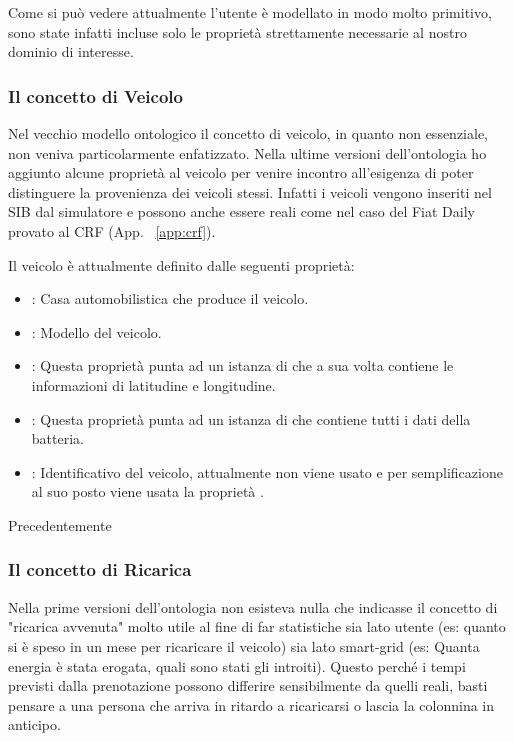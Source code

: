\noindent
Come si può vedere attualmente l'utente è modellato in modo molto primitivo, sono state infatti incluse solo le proprietà strettamente necessarie al nostro dominio di interesse. 

\subsubsection{Il concetto di Veicolo}\label{subsubsec:vehicle}

Nel vecchio modello ontologico il concetto di veicolo, in quanto non essenziale, non veniva particolarmente enfatizzato. Nella ultime versioni dell'ontologia ho aggiunto alcune proprietà al veicolo per venire incontro all'esigenza di poter distinguere la provenienza dei veicoli stessi. Infatti i veicoli vengono inseriti nel SIB dal simulatore e possono anche essere reali come nel caso del Fiat Daily provato al CRF (App. ~\ref{app:crf}).

Il veicolo è attualmente definito dalle seguenti proprietà:

\begin{itemize}
	\item {}: Casa automobilistica che produce il veicolo.
	\item {}: Modello del veicolo.
	\item {}: Questa proprietà punta ad un istanza di  che a sua volta contiene le informazioni di latitudine e longitudine.
	\item {}: Questa proprietà punta ad un istanza di  che contiene tutti i dati della batteria.
	\item {}: Identificativo del veicolo, attualmente non viene usato e per semplificazione al suo posto viene usata la proprietà .
\end{itemize}

Precedentemente 


\subsubsection{Il concetto di Ricarica}

Nella prime versioni dell'ontologia non esisteva nulla che indicasse il concetto di "ricarica avvenuta" molto utile al fine di far statistiche sia lato utente (es: quanto si è speso in un mese per ricaricare il veicolo) sia lato smart-grid (es: Quanta energia è stata erogata, quali sono stati gli introiti). Questo perché i tempi previsti dalla prenotazione possono differire sensibilmente da quelli reali, basti pensare a una persona che arriva in ritardo a ricaricarsi o lascia la colonnina in anticipo. 


